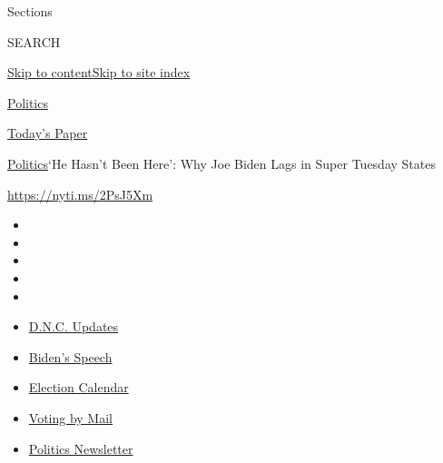 Sections

SEARCH

\protect\hyperlink{site-content}{Skip to
content}\protect\hyperlink{site-index}{Skip to site index}

\href{https://www.nytimes3xbfgragh.onion/section/politics}{Politics}

\href{https://myaccount.nytimes3xbfgragh.onion/auth/login?response_type=cookie\&client_id=vi}{}

\href{https://www.nytimes3xbfgragh.onion/section/todayspaper}{Today's
Paper}

\href{/section/politics}{Politics}\textbar{}`He Hasn't Been Here': Why
Joe Biden Lags in Super Tuesday States

\url{https://nyti.ms/2PsJ5Xm}

\begin{itemize}
\item
\item
\item
\item
\item
\end{itemize}

\begin{itemize}
\item
  \href{https://www.nytimes3xbfgragh.onion/live/2020/08/21/us/dnc-convention-election?action=click\&pgtype=Article\&state=default\&region=TOP_BANNER\&context=storylines_menu}{D.N.C.
  Updates}
\item
  \href{https://www.nytimes3xbfgragh.onion/2020/08/20/us/politics/biden-presidential-nomination-dnc.html?action=click\&pgtype=Article\&state=default\&region=TOP_BANNER\&context=storylines_menu}{Biden's
  Speech}
\item
  \href{https://www.nytimes3xbfgragh.onion/interactive/2019/us/elections/2020-presidential-election-calendar.html?action=click\&pgtype=Article\&state=default\&region=TOP_BANNER\&context=storylines_menu}{Election
  Calendar}
\item
  \href{https://www.nytimes3xbfgragh.onion/interactive/2020/08/11/us/politics/vote-by-mail-us-states.html?action=click\&pgtype=Article\&state=default\&region=TOP_BANNER\&context=storylines_menu}{Voting
  by Mail}
\item
  \href{https://www.nytimes3xbfgragh.onion/newsletters/politics?action=click\&pgtype=Article\&state=default\&region=TOP_BANNER\&context=storylines_menu}{Politics
  Newsletter}
\end{itemize}

